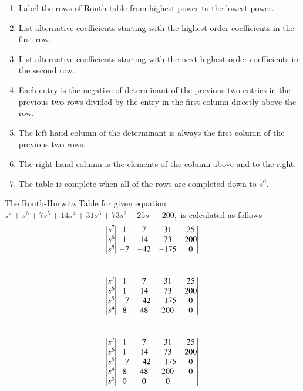 \begin{enumerate}
    \item Label the rows of Routh table from highest power to the lowest power.
    \item List alternative coefficients starting with the highest order coefficients in the first row.
    \item List alternative coefficients starting with the next highest order coefficients in the second row.
    \item Each entry is the negative of determinant of the previous two entries in the previous two rows divided by the entry in the first column directly above the row.
    \item The left hand column of the determinant is always the first column of the previous two rows.
    \item The right hand column is the elements of the column above and to the right.
    \item The table is complete when all of the rows are completed down to $s^0$.
\end{enumerate}
The Routh-Hurwitz Table for given equation $s^{7}+s^{6}+7 s^{5}+14 s^{4}+31s^{3}+73 s^{2}+25 s+$ $200,$ is calculated as follows\\
\begin{align}
\begin{vmatrix}s^7\\s^6\\s^5\end{vmatrix}
\begin{vmatrix}1 & 7 & 31 & 25 \\ 1 & 14 & 73 & 200 \\ -7 & -42 & -175 & 0\end{vmatrix}
\end{align}\\
\begin{align}
\begin{vmatrix}s^7\\s^6\\s^5\\s^4\end{vmatrix}
\begin{vmatrix}1 & 7 & 31 & 25 \\ 1 & 14 & 73 & 200 \\ -7 & -42 & -175 & 0 \\ 8 & 48 & 200 & 0\end{vmatrix}
\end{align}\\
\begin{align}
\begin{vmatrix}s^7\\s^6\\s^5\\s^4\\s^3\end{vmatrix}
\begin{vmatrix}1 & 7 & 31 & 25 \\ 1 & 14 & 73 & 200 \\ -7 & -42 & -175 & 0 \\ 8 & 48 & 200 & 0 \\ 0 & 0 & 0 &  \end{vmatrix}
\end{align}\\

